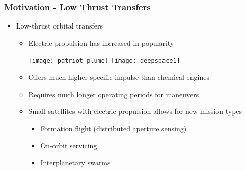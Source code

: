 \begin{frame} %
\frametitle{Motivation - Low Thrust Transfers} %
\begin{itemize}
	\item Low-thrust orbital transfers
	\begin{itemize}
		\item Electric propulsion has increased in popularity

 		\texttt{[image: patriot\_plume]}
		\hfill
 		\texttt{[image: deepspace1]}
 
		\item Offers much higher specific impulse than chemical engines 
		
		\item Requires much longer operating periods for maneuvers 
		\item Small satellites with electric propulsion allows for new mission types
			\begin{itemize}
				\item Formation flight (distributed aperture sensing)
				\item On-orbit servicing
				\item Interplanetary swarms
			\end{itemize}
	\end{itemize}
\end{itemize}
\end{frame}   %